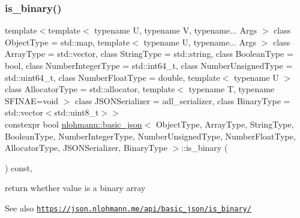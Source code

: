 \subsubsection{\texorpdfstring{is\+\_\+binary()}{is\_binary()}}
{\footnotesize\ttfamily template$<$template$<$ typename U, typename V, typename... Args $>$ class Object\+Type = std\+::map, template$<$ typename U, typename... Args $>$ class Array\+Type = std\+::vector, class String\+Type  = std\+::string, class Boolean\+Type  = bool, class Number\+Integer\+Type  = std\+::int64\+\_\+t, class Number\+Unsigned\+Type  = std\+::uint64\+\_\+t, class Number\+Float\+Type  = double, template$<$ typename U $>$ class Allocator\+Type = std\+::allocator, template$<$ typename T, typename S\+F\+I\+N\+A\+E=void $>$ class J\+S\+O\+N\+Serializer = adl\+\_\+serializer, class Binary\+Type  = std\+::vector$<$std\+::uint8\+\_\+t$>$$>$ \\
constexpr bool \hyperlink{classnlohmann_1_1basic__json}{nlohmann\+::basic\+\_\+json}$<$ Object\+Type, Array\+Type, String\+Type, Boolean\+Type, Number\+Integer\+Type, Number\+Unsigned\+Type, Number\+Float\+Type, Allocator\+Type, J\+S\+O\+N\+Serializer, Binary\+Type $>$\+::is\+\_\+binary (\begin{DoxyParamCaption}{ }\end{DoxyParamCaption}) const\hspace{0.3cm}{\ttfamily [inline]}, {\ttfamily [noexcept]}}



return whether value is a binary array 

\begin{DoxySeeAlso}{See also}
\href{https://json.nlohmann.me/api/basic_json/is_binary/}{\tt https\+://json.\+nlohmann.\+me/api/basic\+\_\+json/is\+\_\+binary/} 
\end{DoxySeeAlso}
\mbox{\label{classnlohmann_1_1basic__json_a911b11e855e685fa59ea1d111490b36b}} 
